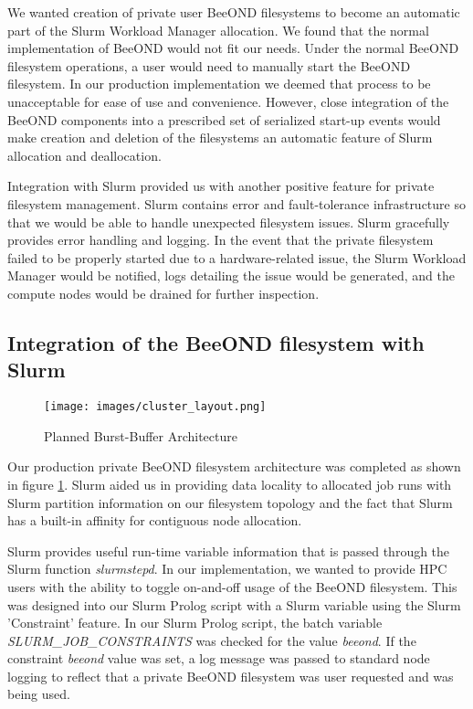 We wanted creation of private user BeeOND filesystems  to become an automatic part of the Slurm Workload Manager allocation. We found that the normal implementation of BeeOND would not fit our needs.  Under the normal BeeOND filesystem operations, a user would need to manually start the BeeOND filesystem.  In our production implementation we deemed that process to be unacceptable for ease of use and convenience.  However, close integration of the BeeOND components into a prescribed set of serialized start-up events would make creation and deletion of the filesystems an automatic feature of Slurm allocation and deallocation. 

Integration with Slurm provided us with another positive feature for private filesystem management.  Slurm contains error and fault-tolerance infrastructure so that we would be able to handle unexpected filesystem issues.  Slurm gracefully provides error handling and logging.  In the event that the private filesystem failed to be properly started due to a hardware-related issue, the Slurm Workload Manager would be notified, logs detailing the issue would be generated, and the compute nodes would be drained for further inspection.

\subsection{Integration of the BeeOND filesystem with Slurm}

\begin{figure}[!htb]
  \centerline{\texttt{[image: images/cluster\_layout.png]}}
  \caption{Planned Burst-Buffer Architecture}
  \label{fig:cluster_layout}
\end{figure}

Our production private BeeOND filesystem  architecture was completed as shown in figure \ref{fig:cluster_layout}.  Slurm aided us in providing data locality to allocated job runs with Slurm partition information on our filesystem topology and the fact that Slurm has a built-in affinity for contiguous node allocation. 

Slurm provides useful run-time variable information that is passed through the Slurm function \textit {slurmstepd}.  In our implementation, we wanted to provide HPC users with the ability to toggle on-and-off usage of the BeeOND filesystem.  This was designed into our Slurm Prolog script with a Slurm variable using the Slurm 'Constraint' feature.  In our Slurm Prolog script, the batch variable \textit{SLURM\_JOB\_CONSTRAINTS} was checked for the value \textit{beeond}. If the constraint \textit{beeond} value was set, a log message was passed to standard node logging to reflect that a private BeeOND filesystem was user requested and was being used. 

